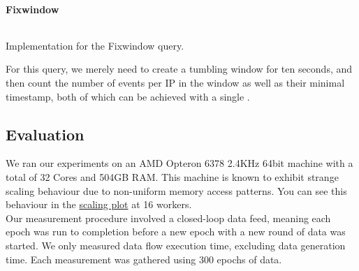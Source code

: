 \paragraph{Fixwindow}
\begin{listing}[H]
  \inputminted[firstline=205,lastline=209]{rust}{benchmarks/src/hibench.rs}
  \caption{Implementation for the Fixwindow query.}
  \label{lst:hibench-fixwindow}
\end{listing}

For this query, we merely need to create a tumbling window for ten seconds, and then count the number of events per IP in the window as well as their minimal timestamp, both of which can be achieved with a single .

\subsection{Evaluation}
We ran our experiments on an AMD Opteron 6378 2.4KHz 64bit machine with a total of 32 Cores and 504GB RAM. This machine is known to exhibit strange scaling behaviour due to non-uniform memory access patterns. You can see this behaviour in the \hyperref[figure:ysb-scaling]{scaling plot} at 16 workers. \\

Our measurement procedure involved a closed-loop data feed, meaning each epoch was run to completion before a new epoch with a new round of data was started. We only measured data flow execution time, excluding data generation time. Each measurement was gathered using 300 epochs of data. \\




